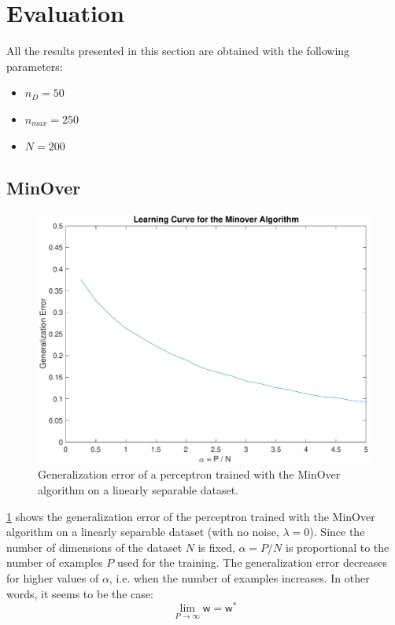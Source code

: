 \section{Evaluation}
\label{sec:evaluation}

All the results presented in this section are obtained with the following parameters:
\begin{itemize}
    \item $n_D = 50$
    \item $n_{max} = 250$
    \item $N = 200$
\end{itemize}

\subsection{MinOver}
\begin{figure}[t]
	\centering
	\includegraphics[width=\columnwidth]{figures/base}
    \caption{Generalization error of a perceptron trained with the MinOver algorithm on a linearly separable dataset.}
	\label{fig:base}
\end{figure}

\cref{fig:base} shows the generalization error of the perceptron trained with the MinOver algorithm on a linearly separable dataset (with no noise, $\lambda = 0$).
Since the number of dimensions of the dataset $N$ is fixed, $\alpha = P / N$ is proportional to the number of examples $P$ used for the training.
The generalization error decreases for higher values of $\alpha$, i.e. when the number of examples increases.
In other words, it seems to be the case:
$$\lim_{P \to \infty} \bm{\mathsf{w}} = \bm{\mathsf{w}}^{*}$$

